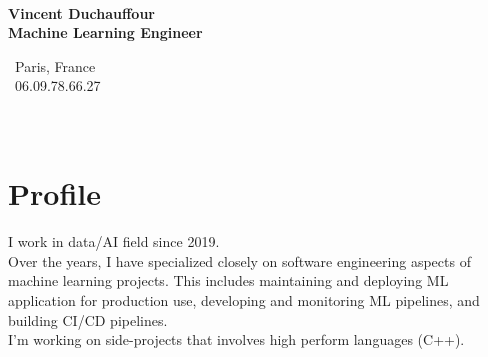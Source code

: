 \documentclass[a4paper,10pt]{article}
\begin{document}
\thispagestyle{empty}


\begin{adjustbox}{valign=t}
    \begin{minipage}{0.32\textwidth}
        \begin{center}
            {\Large \bfseries \\Vincent Duchauffour}\\
            {\large \bfseries Machine Learning Engineer}\\[1cm]
            \raggedright
            \vspace{-.5cm}
            \faHome~Paris, France\\
            \faPhone~06.09.78.66.27\\
            \textcolor{ColorTwo}{\faEnvelopeO}
            \\
            \textcolor{ColorTwo}{\faLinkedin}
            \\
            \textcolor{ColorTwo}{\faGithub}
        \end{center}
        \vspace{-.5cm}
        \section*{Profile}
        \justifying
        I work in data/AI field since 2019. \\Over the years, I have specialized closely on software engineering aspects of machine learning projects. This includes maintaining and deploying ML application for production use, developing and monitoring ML pipelines, and building CI/CD pipelines. \\I'm working on side-projects that involves high perform languages (C++).
        \vspace{-.5cm}

\end{minipage}
\end{adjustbox}
\end{document}
